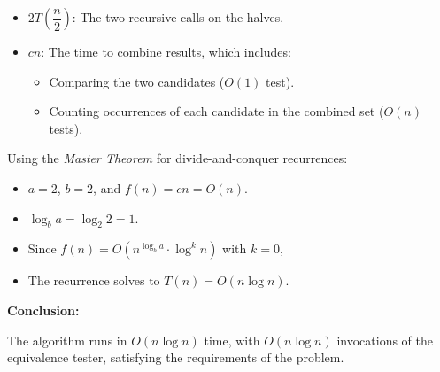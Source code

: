 \documentclass[10pt,letter,notitlepage]{article}
\begin{document}
\begin{Answer}
\begin{enumerate}[(a)]
    \begin{itemize}
        \item $2T\left(\dfrac{n}{2}\right)$: The two recursive calls on the halves.
        \item $cn$: The time to combine results, which includes:
        \begin{itemize}
            \item Comparing the two candidates ($O(1)$ test).
            \item Counting occurrences of each candidate in the combined set ($O(n)$ tests).
        \end{itemize}
    \end{itemize}

    Using the \textit{Master Theorem} for divide-and-conquer recurrences:

    \begin{itemize}
        \item $a = 2$, $b = 2$, and $f(n) = cn = O(n)$.
        \item $\log_b a = \log_2 2 = 1$.
        \item Since $f(n) = O(n^{\log_b a} \cdot \log^k n)$ with $k = 0$,
        \item The recurrence solves to $T(n) = O(n \log n)$.
    \end{itemize}

    \textbf{Conclusion:}

    The algorithm runs in $O(n \log n)$ time, with $O(n \log n)$ invocations of the equivalence tester, satisfying the requirements of the problem.
\end{enumerate}
\end{Answer}
\end{document}
